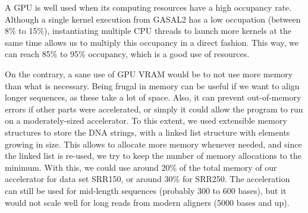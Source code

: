 A GPU is well used when its computing resources have a high occupancy rate. Although a single kernel execution from GASAL2 has a low occupation (between 8\% to 15\%), instantiating multiple CPU threads to launch more kernels at the same time allows us to multiply this occupancy in a direct fashion. This way, we can reach 85\% to 95\% occupancy, which is a good use of resources.

On the contrary, a sane use of GPU VRAM would be to not use more memory than what is necessary. Being frugal in memory can be useful if we want to align longer sequences, as these take a lot of space. Also, it can prevent out-of-memory errors if other parts were accelerated, or simply it could allow the program to run on a moderately-sized accelerator. To this extent, we used extensible memory structures to store the DNA strings, with a linked list structure with elements growing in size. This allows to allocate more memory whenever needed, and since the linked list is re-used, we try to keep the number of memory allocations to the minimum. With this, we could use around 20\% of the total memory of our accelerator for data set SRR150, or around 30\% for SRR250. The acceleration can still be used for mid-length sequences (probably 300 to 600 bases), but it would not scale well for long reads from modern aligners (5000 bases and up).

